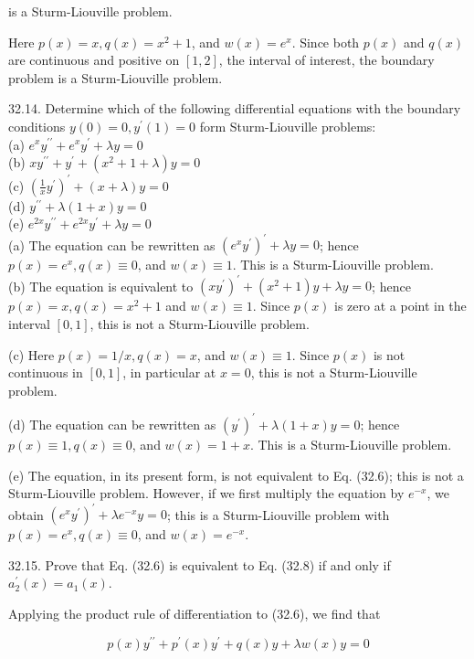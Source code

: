 \documentclass[10pt]{article}
\begin{document}
is a Sturm-Liouville problem.

Here $p(x)=x, q(x)=x^{2}+1$, and $w(x)=e^{x}$. Since both $p(x)$ and $q(x)$ are continuous and positive on $[1,2]$, the interval of interest, the boundary problem is a Sturm-Liouville problem.

32.14. Determine which of the following differential equations with the boundary conditions $y(0)=0, y^{\prime}(1)=0$ form Sturm-Liouville problems:\\
(a) $e^{x} y^{\prime \prime}+e^{x} y^{\prime}+\lambda y=0$\\
(b) $x y^{\prime \prime}+y^{\prime}+\left(x^{2}+1+\lambda\right) y=0$\\
(c) $\left(\frac{1}{x} y^{\prime}\right)^{\prime}+(x+\lambda) y=0$\\
(d) $y^{\prime \prime}+\lambda(1+x) y=0$\\
(e) $e^{2 x} y^{\prime \prime}+e^{2 x} y^{\prime}+\lambda y=0$\\
(a) The equation can be rewritten as $\left(e^{x} y^{\prime}\right)^{\prime}+\lambda y=0$; hence $p(x)=e^{x}, q(x) \equiv 0$, and $w(x) \equiv 1$. This is a Sturm-Liouville problem.\\
(b) The equation is equivalent to $\left(x y^{\prime}\right)^{\prime}+\left(x^{2}+1\right) y+\lambda y=0$; hence $p(x)=x, q(x)=x^{2}+1$ and $w(x) \equiv 1$. Since $p(x)$ is zero at a point in the interval $[0,1]$, this is not a Sturm-Liouville problem.

(c) Here $p(x)=1 / x, q(x)=x$, and $w(x) \equiv 1$. Since $p(x)$ is not continuous in $[0,1]$, in particular at $x=0$, this is not a Sturm-Liouville problem.

(d) The equation can be rewritten as $\left(y^{\prime}\right)^{\prime}+\lambda(1+x) y=0$; hence $p(x) \equiv 1, q(x) \equiv 0$, and $w(x)=1+x$. This is a Sturm-Liouville problem.

(e) The equation, in its present form, is not equivalent to Eq. (32.6); this is not a Sturm-Liouville problem. However, if we first multiply the equation by $e^{-x}$, we obtain $\left(e^{x} y^{\prime}\right)^{\prime}+\lambda e^{-x} y=0$; this is a Sturm-Liouville problem with $p(x)=e^{x}, q(x) \equiv 0$, and $w(x)=e^{-x}$.

32.15. Prove that Eq. (32.6) is equivalent to Eq. (32.8) if and only if $a_{2}^{\prime}(x)=a_{1}(x)$.

Applying the product rule of differentiation to (32.6), we find that


\begin{equation*}
p(x) y^{\prime \prime}+p^{\prime}(x) y^{\prime}+q(x) y+\lambda w(x) y=0 \tag{1}
\end{equation*}
\end{document}
